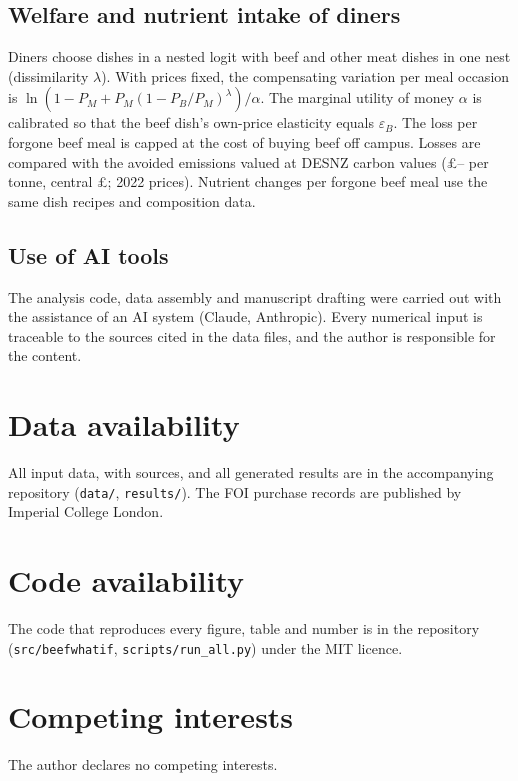 \documentclass[10pt]{article}
\begin{document}
\subsection{Welfare and nutrient intake of diners}
Diners choose dishes in a nested logit with beef and other meat dishes in one nest (dissimilarity
$\lambda$). With prices fixed, the compensating variation per meal occasion is
$\ln\!\left(1-P_M+P_M(1-P_B/P_M)^{\lambda}\right)/\alpha$\cite{small1981,train2009}. The marginal utility of
money $\alpha$ is calibrated so that the beef dish's own-price elasticity equals $\varepsilon_B$. The loss per
forgone beef meal is capped at the cost of buying beef off campus. Losses are compared with the
avoided emissions valued at DESNZ carbon values (£\CarbonValueLow--\CarbonValueHigh{} per tonne, central
£\CarbonValue{}; 2022 prices)\cite{desnz2023carbon}. Nutrient changes per forgone beef meal use the same
dish recipes and composition data.

\subsection{Use of AI tools}
The analysis code, data assembly and manuscript drafting were carried out with the assistance of
an AI system (Claude, Anthropic). Every numerical input is traceable to the sources cited in the
data files, and the author is responsible for the content.

\section{Data availability}
All input data, with sources, and all generated results are in the accompanying repository
(\texttt{data/}, \texttt{results/}). The FOI purchase records are published by Imperial College London\cite{imperialfoi}.

\section{Code availability}
The code that reproduces every figure, table and number is in the repository (\texttt{src/beefwhatif},
\texttt{scripts/run\_all.py}) under the MIT licence.

\section{Competing interests}
The author declares no competing interests.
\end{document}
